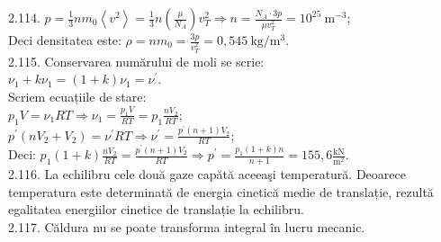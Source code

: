 2.114. $p=\frac{1}{3} n m_{0}\left\langle v^{2}\right\rangle=\frac{1}{3} n\left(\frac{\mu}{N_{A}}\right) v_{T}^{2} \Rightarrow n=\frac{N_{A} \cdot 3 p}{\mu v_{T}^{2}}=10^{25} \mathrm{~m}^{-3}$;\\ Deci densitatea este: $\rho=n m_{0}=\frac{3 p}{v_{T}^{2}}=0,545 \mathrm{~kg} / \mathrm{m}^{3}$.\\

2.115. Conservarea numărului de moli se scrie:\\ $\nu_{1}+k \nu_{1}=(1+k) \nu_{1}=\nu^{\prime}$.\\ Scriem ecuațiile de stare:\\ $p_{1} V=\nu_{1} R T \Rightarrow \nu_{1}=\frac{p_{1} V}{R T}=p_{1} \frac{n V_{2}}{R T};$\\ $p^{\prime}\left(n V_{2}+V_{2}\right)=\nu^{\prime} R T \Rightarrow \nu^{\prime}=\frac{p^{\prime}(n+1) V_{2}}{R T}$;\\ Deci: $p_{1}(1+k) \frac{n V_{2}}{R T}=\frac{p^{\prime}(n+1) V_{2}}{R T} \Rightarrow p^{\prime}=\frac{p_{1}(1+k) n}{n+1}=155,6 \frac{\mathrm{kN}}{\mathrm{m}^{2}}$.\\

2.116. La echilibru cele două gaze capătă aceeaşi temperatură. Deoarece temperatura este determinată de energia cinetică medie de translație, rezultă egalitatea energiilor cinetice de translație la echilibru.\\

2.117. Căldura nu se poate transforma integral în lucru mecanic.\\

